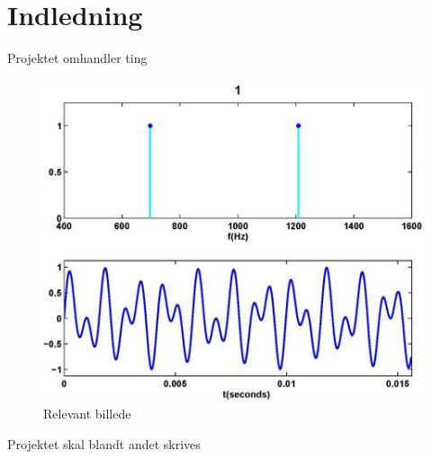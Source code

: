 \section{Indledning}
Projektet omhandler ting

\begin{figure}[h]
\centering
\includegraphics[scale=0.5]{Billeder/DTMF1.JPG}
\caption{Relevant billede}
\label{fig:DTMF1}
\end{figure}

Projektet skal blandt andet skrives 